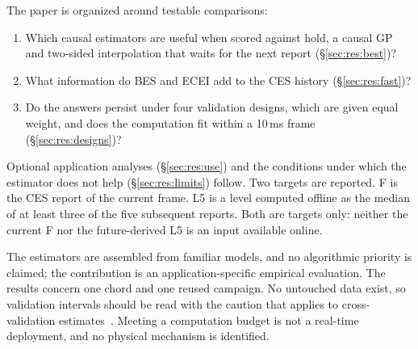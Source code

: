 The paper is organized around testable comparisons:
\begin{enumerate}\setlength{\itemsep}{1pt}\setlength{\parskip}{0pt}
\item Which causal estimators are useful when scored against hold, a causal GP and two-sided interpolation that waits for the next report (\S\ref{sec:res:best})?
\item What information do BES and ECEI add to the CES history (\S\ref{sec:res:fast})?
\item Do the answers persist under four validation designs, which are given equal weight, and does the computation fit within a 10\,ms frame (\S\ref{sec:res:designs})?
\end{enumerate}
Optional application analyses (\S\ref{sec:res:use}) and the conditions under which the estimator does not help (\S\ref{sec:res:limits}) follow. Two targets are reported. F is the CES report of the current frame. L5 is a level computed offline as the median of at least three of the five subsequent reports. Both are targets only: neither the current F nor the future-derived L5 is an input available online.

The estimators are assembled from familiar models, and no algorithmic priority is claimed; the contribution is an application-specific empirical evaluation. The results concern one chord and one reused campaign. No untouched data exist, so validation intervals should be read with the caution that applies to cross-validation estimates~\citep{Bates2024CrossValidation}. Meeting a computation budget is not a real-time deployment, and no physical mechanism is identified.

